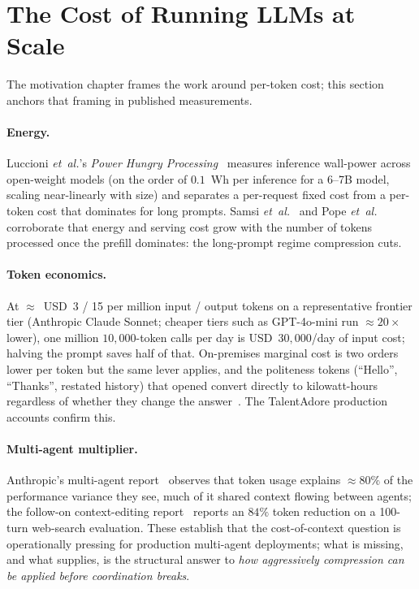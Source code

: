\section{The Cost of Running LLMs at Scale}
\label{sec:rw_cost}

The motivation chapter frames the work around per-token cost; this
section anchors that framing in published measurements.

\paragraph{Energy.}
Luccioni \emph{et~al.}'s \emph{Power Hungry
Processing}~\cite{luccioni2024powerhungry} measures inference
wall-power across open-weight models (on the order of $0.1$~Wh per
inference for a 6--7B model, scaling near-linearly with size) and
separates a per-request fixed cost from a per-token cost that
dominates for long prompts. Samsi \emph{et~al.}~\cite{samsi2023words}
and Pope \emph{et~al.}~\cite{pope2023efficiently} corroborate that
energy and serving cost grow with the number of tokens processed
once the prefill dominates: the long-prompt regime compression cuts.

\paragraph{Token economics.}
At $\approx$~USD~3 / 15 per million input / output tokens on a
representative frontier tier (Anthropic Claude Sonnet; cheaper tiers
such as GPT-4o-mini run $\approx20\times$ lower), one million
$10{,}000$-token calls per day is
USD~$30{,}000$/day of input cost; halving the prompt saves half of
that. On-premises marginal cost is two orders lower per token but the
same lever applies, and the politeness tokens (``Hello'', ``Thanks'',
restated history) that opened  convert directly
to kilowatt-hours regardless of whether they change the
answer~\cite{altman2025pleasethankyou}. The TalentAdore production
accounts confirm this.

\paragraph{Multi-agent multiplier.}
Anthropic's multi-agent report~\cite{anthropic2025multiagent}
observes that token usage explains $\approx 80\%$ of the performance
variance they see, much of it shared context flowing between agents;
the follow-on context-editing report~\cite{anthropic2025contextediting}
reports an $84\%$ token reduction on a 100-turn web-search
evaluation. These establish that the cost-of-context question is
operationally pressing for production multi-agent deployments; what
is missing, and what  supplies, is the
structural answer to \emph{how aggressively compression can be
applied before coordination breaks}.

